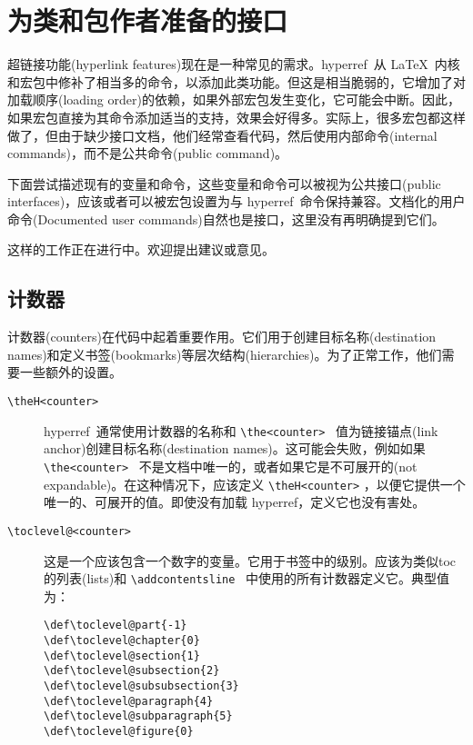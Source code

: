 \documentclass{article}
\newcommand*{\cs}[1]{%
  \texttt{\textbackslash #1}%
}
\newcommand*{\xpackage}[1]{\textsf{#1}}
\begin{document}
\newpage
\section{\heiti 为类和包作者准备的接口}

超链接功能(hyperlink features)现在是一种常见的需求。\xpackage{hyperref}\ 从 \LaTeX{}\ 内核和宏包中修补了相当多的命令，以添加此类功能。但这是相当脆弱的，它增加了对加载顺序(loading order)的依赖，如果外部宏包发生变化，它可能会中断。因此，如果宏包直接为其命令添加适当的支持，效果会好得多。实际上，很多宏包都这样做了，但由于缺少接口文档，他们经常查看代码，然后使用内部命令(internal commands)，而不是公共命令(public command)。

下面尝试描述现有的变量和命令，这些变量和命令可以被视为公共接口(public interfaces)，应该或者可以被宏包设置为与 \xpackage{hyperref}\ 命令保持兼容。文档化的用户命令(Documented user commands)自然也是接口，这里没有再明确提到它们。

这样的工作正在进行中。欢迎提出建议或意见。


\subsection[计数器]{\heiti 计数器}
计数器(counters)在代码中起着重要作用。它们用于创建目标名称(destination names)和定义书签(bookmarks)等层次结构(hierarchies)。为了正常工作，他们需要一些额外的设置。

\begin{description}

  \item[\cs{theH<counter>}]  \xpackage{hyperref}\ 通常使用计数器的名称和 \cs{the<counter>}\ 值为链接锚点(link anchor)创建目标名称(destination names)。这可能会失败，例如如果 \cs{the<counter>}\ 不是文档中唯一的，或者如果它是不可展开的(not expandable)。在这种情况下，应该定义 \cs{theH<counter>}，以便它提供一个唯一的、可展开的值。即使没有加载 \xpackage{hyperref}，定义它也没有害处。

  \item[\cs{toclevel@<counter>}] 这是一个应该包含一个数字的变量。它用于书签中的级别。应该为类似toc的列表(lists)和 \cs{addcontentsline}\ 中使用的所有计数器定义它。典型值为：

        \begin{verbatim}
\def\toclevel@part{-1}
\def\toclevel@chapter{0}
\def\toclevel@section{1}
\def\toclevel@subsection{2}
\def\toclevel@subsubsection{3}
\def\toclevel@paragraph{4}
\def\toclevel@subparagraph{5}
\def\toclevel@figure{0}
\end{verbatim}

\end{description}
\end{document}
